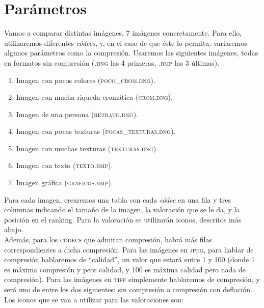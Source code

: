 \documentclass[11pt,a4paper]{article}
\begin{document}
\newpage

\section{Parámetros}

Vamos a comparar distintas imágenes, 7 imágenes concretamente. Para ello, utilizaremos diferentes \textit{códecs}, y, en el caso de que éste lo permita, variaremos algunos parámetros como la compresión. Usaremos las siguientes imágenes, todas en formatos sin compresión (\textsc{.dng} las 4 primeras, \textsc{.bmp} las 3 últimas).

\begin{enumerate}
	\item Imagen con pocos colores (\textsc{poco\_crom.dng}).
	\item Imagen con mucha riqueda cromática (\textsc{crom.dng}).
	\item Imagen de una persona (\textsc{retrato.dng}).
	\item Imagen con pocas texturas (\textsc{pocas\_texturas.dng}).
	\item Imagen con muchas texturas (\textsc{texturas.dng}).
	\item Imagen con texto (\textsc{texto.bmp}).
	\item Imagen gráfica (\textsc{graficos.bmp}).
\end{enumerate}

Para cada imagen, crearemos una tabla con cada \textit{códec} en una fila y tres columnas indicando el tamaño de la imagen, la valoración que se le da, y la posición en el ranking. Para la valoración se utilizarán iconos, descritos más abajo.\\

Además, para los \textsc{códecs} que admitan compresión, habrá más filas correspondientes a dicha compresión. Para las imágenes en \textsc{jpeg}, para hablar de compresión hablaremos de ``calidad'', un valor que estará entre 1 y 100 (donde 1 es máxima compresión y peor calidad, y 100 es máxima calidad pero nada de compresión). Para las imágenes en \textsc{tiff} simplemente hablaremos de compresión, y será uno de entre los dos siguientes: sin compresión o compresión con deflación.\\

Los iconos que se van a utilizar para las valoraciones son:
\end{document}

